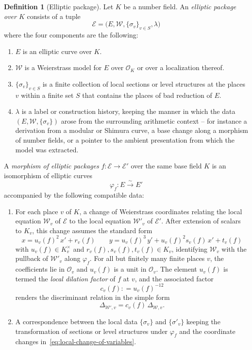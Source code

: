 \documentclass[10pt, reqno]{amsart}
\theoremstyle{plain}
\theoremstyle{definition}
\newtheorem{definition}[theorem]{Definition}
\theoremstyle{plain}
\newcommand{\coloneqq}{\mathrel{\mathop:}=}
\begin{document}
\begin{definition}[Elliptic package]\label{def:EllipticPackage}
Let $K$ be a number field. An \emph{elliptic package over $K$} consists of a tuple
\[
\mathcal{E} = \bigl(E, \mathcal{W}, \{\sigma_v\}_{v \in S}, \lambda\bigr)
\]
where the four components are the following:
\begin{enumerate}
\item[(i)] $E$ is an elliptic curve over $K$.
\item[(ii)] $\mathcal{W}$ is a Weierstrass model for $E$ over $\mathcal{O}_K$ or over a localization thereof.
\item[(iii)] $\{\sigma_v\}_{v \in S}$ is a finite collection of local sections or level structures at the places $v$ within a finite set $S$ that contains the places of bad reduction of $E$.
\item[(iv)] $\lambda$ is a label or construction history, keeping the manner in which the data $(E,\mathcal{W},\{\sigma_v\})$ arose from the surrounding arithmetic context -- for instance a derivation from a modular or Shimura curve, a base change along a morphism of number fields, or a pointer to the ambient presentation from which the model was extracted.
\end{enumerate}

A \emph{morphism of elliptic packages} $f \colon \mathcal{E} \to \mathcal{E}'$ over the same base field $K$ is an isomorphism of elliptic curves
\[
  \varphi_f \colon E \xrightarrow{\sim} E'
\]
accompanied by the following compatible data:
\begin{enumerate}
\item[(i)] For each place $v$ of $K$, a change of Weierstrass coordinates relating the local equation $\mathcal{W}_v$ of $\mathcal{E}$ to the local equation $\mathcal{W}'_v$ of $\mathcal{E}'$. After extension of scalars to $K_v$, this change assumes the standard form
  \begin{equation}\label{eq:local-change-of-variables}
    x = u_v(f)^2\,x' + r_v(f)
    \qquad
    y = u_v(f)^3\,y' + u_v(f)^2 s_v(f)\,x' + t_v(f)
  \end{equation}
with $u_v(f) \in K_v^\times$ and $r_v(f), s_v(f), t_v(f) \in K_v$, identifying $\mathcal{W}_v$ with the pullback of $\mathcal{W}'_v$ along $\varphi_f$. For all but finitely many finite places $v$, the coefficients lie in $\mathcal{O}_v$ and $u_v(f)$ is a unit in $\mathcal{O}_v$. The element $u_v(f)$ is termed the \emph{local dilation factor} of $f$ at $v$, and the associated factor
  \[
    c_v(f) \coloneqq u_v(f)^{-12}
  \]
renders the discriminant relation in the simple form
  \[
    \Delta_{\mathcal{W}',v} = c_v(f)\,\Delta_{\mathcal{W},v}.
  \]
\item[(ii)] A correspondence between the local data $\{\sigma_v\}$ and $\{\sigma'_v\}$ keeping the transformation of sections or level structures under $\varphi_f$ and the coordinate changes in~\eqref{eq:local-change-of-variables}.
\end{enumerate}


\end{definition}
\end{document}
